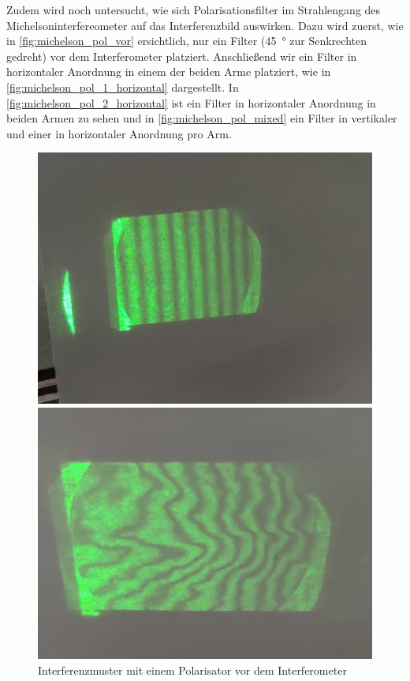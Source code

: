 \documentclass[ngerman]{scrartcl}
\begin{document}
Zudem wird noch untersucht, wie sich Polarisationsfilter im Strahlengang des Michelsoninterfereometer auf das Interferenzbild auswirken.
Dazu wird zuerst, wie in \autoref{fig:michelson_pol_vor} ersichtlich, nur ein Filter (\SI{45}{\degree} zur Senkrechten gedreht) vor dem Interferometer platziert. Anschließend wir ein Filter in horizontaler Anordnung in einem der beiden Arme platziert, wie in \autoref{fig:michelson_pol_1_horizontal} dargestellt. In \autoref{fig:michelson_pol_2_horizontal} ist ein Filter in horizontaler Anordnung in beiden Armen zu sehen und in \autoref{fig:michelson_pol_mixed} ein Filter in vertikaler und einer in horizontaler Anordnung pro Arm.
\setcapindent{0pt}
\begin{figure}[H]
    \centering
    \begin{minipage}[t]{0.45\linewidth}
        \centering
        \includegraphics[width=\linewidth]{fig/Compressed/Out_horizontal_detail.jpg} %
        \caption{Interferenzmuster mit einem Polarisator vor dem Interferometer}
        \label{fig:michelson_pol_vor}
    \end{minipage}%
    \hspace*{\fill}
    \begin{minipage}[t]{0.45\linewidth}
        \centering
        \includegraphics[width=\linewidth]{fig/Compressed/Arago_horizontal_detail.jpg}

\end{minipage}
\end{figure}
\end{document}
